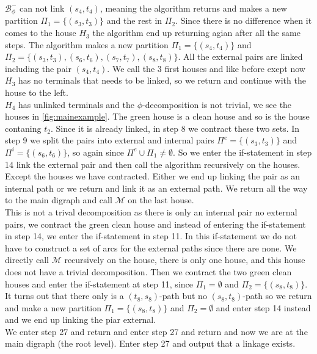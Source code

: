 \begin{example}
    $\mathcal{B}_{\phi}^-$ can not link $(s_4,t_4)$, meaning the algorithm returns and makes a new partition $\Pi_1=\lbrace (s_3,t_3) \rbrace$ and the rest in $\Pi_2$. 
    Since there is no difference when it comes to the house $H_3$ the algorithm end up returning agian after all the same steps. The algorithm makes a new partition $\Pi_1=\lbrace (s_4,t_4) \rbrace$ and $\Pi_2=\lbrace (s_3,t_3),(s_6,t_6),(s_7,t_7),(s_8,t_8)\rbrace$. 
    All the external pairs are linked including the pair $(s_4,t_4)$. 
    We call the 3 first houses and like before exept now $H_3$ has no terminals that needs to be linked, so we return and continue with the house to the left.\\
    $H_4$ has unlinked terminals and the $\phi$-decomposition is not trivial, we see the houses in \autoref{fig:mainexample}. 
    The green house is a clean house and so is the house contaning $t_2$. 
    Since it is already linked, in step 8 we contract these two sets. 
    In step 9 we split the pairs into external and internal pairs $\Pi^e=\lbrace(s_3,t_3)\rbrace$ and $\Pi^i=\lbrace (s_6,t_6)\rbrace$, so again since $\Pi^e\cup \Pi_1\neq \emptyset$.
    So we enter the if-statement in step 14 link the external pair and then call the algorithm recursively on the houses. 
    Except the houses we have contracted. 
    Either we end up linking the pair as an internal path or we return and link it as an external path. 
    We return all the way to the main digraph and call $\mathcal{M}$ on the last house. \\
    This is not a trival decomposition as there is only an internal pair no external pairs, we contract the green clean house and instead of entering the if-statement in step 14, we enter the if-statement in step 11. 
    In this if-statement we do not have to construct a set of arcs for the external paths since there are none. 
    We directly call $\mathcal{M}$ recursively on the house, there is only one house, and this house does not have a trivial decomposition. 
    Then we contract the two green clean houses and enter the if-statement at step 11, since $\Pi_1=\emptyset$ and $\Pi_2=\lbrace (s_8,t_8)\rbrace$.   
    It turns out that there only is a $(t_8,s_8)$-path but no $(s_8,t_8)$-path so we return and make a new partition  $\Pi_1=\lbrace (s_8,t_8)\rbrace$ and $\Pi_2=\emptyset$ and enter step 14 instead and we end up linking the piar external. \\
    We enter step 27 and return and enter step 27 and return and now we are at the main digraph (the root level). 
    Enter step 27 and output that a linkage exists. 
\end{example}
